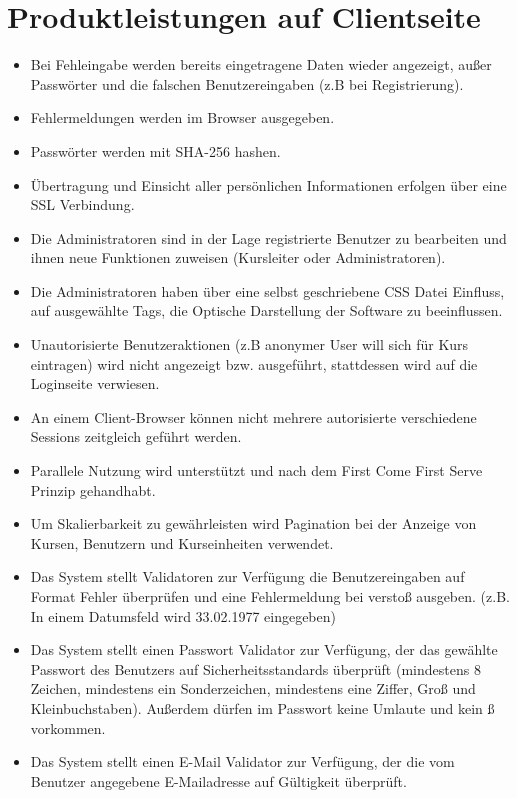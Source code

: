 \documentclass[a4paper]{scrreprt}
\begin{document}
\section{Produktleistungen auf Clientseite}
\begin{itemize}
	\item \Func{} Bei Fehleingabe werden bereits eingetragene Daten wieder angezeigt, außer Passwörter und die falschen Benutzereingaben (z.B bei Registrierung).
	\item \Func{} Fehlermeldungen werden im Browser ausgegeben.
	\item \Func{} Passwörter werden mit SHA-256 \gls{hashen}.
	\item \Func{} Übertragung und Einsicht aller persönlichen Informationen erfolgen über eine SSL Verbindung.
	\item \Func{} Die Administratoren sind in der Lage registrierte Benutzer zu bearbeiten und ihnen neue Funktionen zuweisen (Kursleiter oder Administratoren).
	\item \Func{} Die Administratoren haben über eine selbst geschriebene CSS Datei Einfluss, auf ausgewählte Tags, die Optische Darstellung der Software zu beeinflussen. 
	\item \Func{} Unautorisierte Benutzeraktionen (z.B anonymer User will sich für Kurs eintragen) wird nicht angezeigt bzw. ausgeführt, stattdessen wird auf die Loginseite verwiesen.
	\item \Func{} An einem Client-Browser können nicht mehrere autorisierte verschiedene Sessions zeitgleich geführt werden.
	\item \Func{} Parallele Nutzung wird unterstützt und nach dem First Come First Serve Prinzip gehandhabt.
	\item \Func{} Um Skalierbarkeit zu gewährleisten wird Pagination bei der Anzeige von Kursen, Benutzern und Kurseinheiten verwendet. 
	\item \Func{} Das System stellt Validatoren zur Verfügung die Benutzereingaben auf Format Fehler überprüfen und eine Fehlermeldung bei verstoß ausgeben. (z.B. In einem Datumsfeld wird 33.02.1977 eingegeben)
	\item \Func{} Das System stellt einen Passwort Validator zur Verfügung, der das gewählte Passwort des Benutzers auf Sicherheitsstandards überprüft (mindestens 8 Zeichen, mindestens ein Sonderzeichen, mindestens eine Ziffer, Groß und Kleinbuchstaben). Außerdem dürfen im Passwort keine Umlaute und kein ß vorkommen.
	\item \Func{} Das System stellt einen E-Mail Validator zur Verfügung, der die vom Benutzer angegebene E-Mailadresse auf Gültigkeit überprüft.

\end{itemize}
\end{document}
